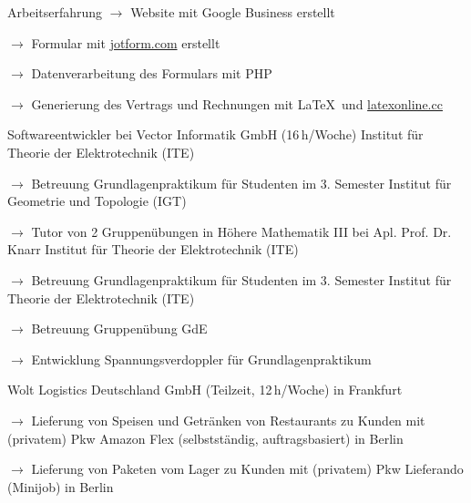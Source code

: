 \begin{rubric}{\textcolor{black!20!blue!100}{Arbeitserfahrung}}
				\setlength{\hangindent}{\widthof{$\rightarrow$ }}
				$\rightarrow$ Website mit Google Business erstellt
	
				$\rightarrow$ Formular mit \href{https://www.jotform.com/}{jotform.com} erstellt
	
				$\rightarrow$ Datenverarbeitung des Formulars mit PHP
	
				$\rightarrow$ Generierung des Vertrags und Rechnungen mit \LaTeX\ und \href{https://latexonline.cc/}{latexonline.cc}
				
			\entry*[05/2016 --- 10/2017]
				Softwareentwickler bei Vector Informatik GmbH (16\,h/Woche)
			\entry*[10/2015 --- 03/2016]
				Institut für Theorie der Elektrotechnik (ITE)
					
				\setlength{\hangindent}{\widthof{$\rightarrow$ }}
				$\rightarrow$ Betreuung Grundlagenpraktikum für Studenten im 3. Semester
			\entry*
				Institut für Geometrie und Topologie (IGT)
				
				\setlength{\hangindent}{\widthof{$\rightarrow$ }}
				$\rightarrow$ Tutor von 2 Gruppenübungen in Höhere Mathematik III bei Apl. Prof. Dr. Knarr
			\entry*[10/2014 --- 03/2015]
				Institut für Theorie der Elektrotechnik (ITE)
				
				\setlength{\hangindent}{\widthof{$\rightarrow$ }}
				$\rightarrow$ Betreuung Grundlagenpraktikum für Studenten im 3. Semester
			\entry*[10/2013 --- 03/2014]
				Institut für Theorie der Elektrotechnik (ITE)
				
				\setlength{\hangindent}{\widthof{$\rightarrow$ }}
				$\rightarrow$ Betreuung Gruppenübung GdE
				
				$\rightarrow$ Entwicklung Spannungsverdoppler für Grundlagenpraktikum
		
			\entry*[06/03/2024 --- 05/03/2025]
				Wolt Logistics Deutschland GmbH (Teilzeit, 12\,h/Woche) in Frankfurt
				
				\setlength{\hangindent}{\widthof{$\rightarrow$ }}
				$\rightarrow$ Lieferung von Speisen und Getränken von Restaurants zu Kunden mit (privatem) Pkw
			\entry*[09/11/2020 --- 06/2022]
				Amazon Flex (selbstständig, auftragsbasiert) in Berlin
				
				\setlength{\hangindent}{\widthof{$\rightarrow$ }}
				$\rightarrow$ Lieferung von Paketen vom Lager zu Kunden mit (privatem) Pkw
			\entry*[24/10/2020 --- 04/01/2021]
				Lieferando (Minijob) in Berlin
				

\end{rubric}
